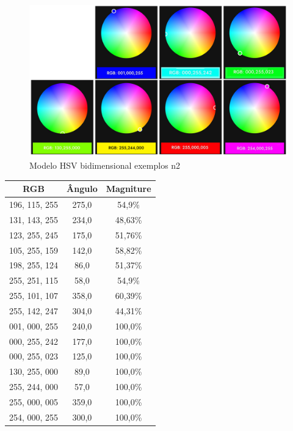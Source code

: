 \begin{figure}[htb]
	\centering
	\includegraphics[width=1.0\textwidth]{figures/example_2_arduino_color}
	\caption{Modelo HSV bidimensional exemplos n2}
	\label{hsv_exemplo_2}
\end{figure}

\begin{quadro}[htb]
	\caption{\label{HSV_resultado}Resultado algoritmo}
		 \begin{tabular}{|c|c|c|}
			\hline
			\textbf{RGB} & \textbf{Ângulo} & \textbf{Magniture} \\ \hline
			196, 115, 255 & 275,0 & 54,9\% \\ \hline
			131, 143, 255 & 234,0 & 48,63\% \\ \hline
			123, 255, 245 & 175,0 & 51,76\% \\ \hline
			105, 255, 159 & 142,0 & 58,82\% \\ \hline
			198, 255, 124 & 86,0 & 51,37\% \\ \hline
			255, 251, 115 & 58,0 & 54,9\% \\ \hline
			255, 101, 107 & 358,0 & 60,39\% \\ \hline
			255, 142, 247 & 304,0 & 44,31\% \\ \hline
			001, 000, 255 & 240,0 & 100,0\% \\ \hline
			000, 255, 242 & 177,0 & 100,0\% \\ \hline
			000, 255, 023 & 125,0 & 100,0\% \\ \hline
			130, 255, 000 & 89,0 & 100,0\% \\ \hline
			255, 244, 000 & 57,0 & 100,0\% \\ \hline
			255, 000, 005 & 359,0 & 100,0\% \\ \hline
			254, 000, 255 & 300,0 & 100,0\% \\ \hline
		\end{tabular}
	\end{quadro}



